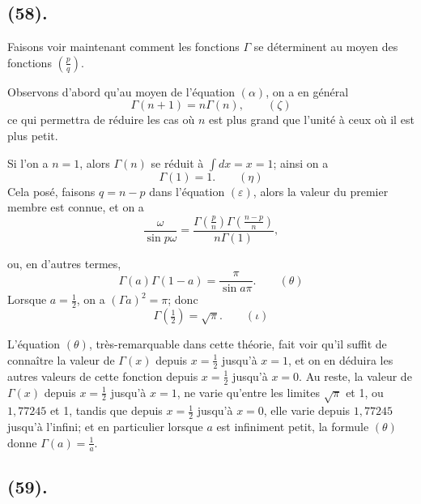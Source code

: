 \documentclass{article}
\begin{document}
\subsection*{(58).}

Faisons voir maintenant comment les fonctions $\Gamma$ se déterminent au moyen des fonctions $\left(\frac{p}{q}\right)$.

Observons d'abord qu'au moyen de l'équation $(\alpha)$, on a en général
\[ \Gamma(n+1)=n\Gamma(n),\qquad(\zeta) \]
ce qui permettra de réduire les cas où $n$ est plus grand que l'unité à ceux où il est plus petit.

Si l'on a $n=1$, alors $\Gamma(n)$ se réduit à $\displaystyle\int dx=x=1$; ainsi on a
\[ \Gamma(1)=1.\qquad(\eta) \]
Cela posé, faisons $q=n-p$ dans l'équation $(\varepsilon)$, alors la valeur du premier membre est connue, et on a
\[ \frac{\omega}{\sin p\omega}=\frac{\Gamma\left(\frac{p}{n}\right)\Gamma\left(\frac{n-p}{n}\right)}{n\Gamma(1)}, \]

ou, en d'autres termes,
\[ \Gamma(a)\Gamma(1-a)=\frac{\pi}{\sin a\pi}.\qquad(\theta) \]
Lorsque $a=\frac{1}{2}$, on a $(\Gamma a)^{2}=\pi$; donc
\[ \Gamma\left(\tfrac{1}{2}\right)=\sqrt{\pi}.\qquad(\iota) \]

L'équation $(\theta)$, très-remarquable dans cette théorie, fait voir qu'il suffit de connaître la valeur de $\Gamma(x)$ depuis $x=\frac{1}{2}$ jusqu'à $x=1$, et on en déduira les autres valeurs de cette fonction depuis $x=\frac{1}{2}$ jusqu'à $x=0$. Au reste, la valeur de $\Gamma(x)$ depuis $x=\frac{1}{2}$ jusqu'à $x=1$, ne varie qu'entre les limites $\sqrt{\pi}$ et 1, ou $1{,}77245$ et 1, tandis que depuis $x=\frac{1}{2}$ jusqu'à $x=0$, elle varie depuis $1{,}77245$ jusqu'à l'infini; et en particulier lorsque $a$ est infiniment petit, la formule $(\theta)$ donne $\Gamma(a)=\frac{1}{a}$.

\subsection*{(59).}
\end{document}
